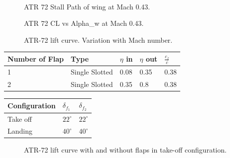 \noindent \\

\begin{figure}[H]
\centering

\caption{ATR 72 Stall Path of wing at Mach 0.43.}
\label{fig:stallATR}
\end{figure}


\begin{figure}[H]
\centering

\caption{ATR 72 CL vs Alpha_w at Mach 0.43.}
\label{fig:clATR}
\end{figure}

\begin{figure}[H]
\centering

\caption{ATR-72 lift curve. Variation with Mach number.}
\label{fig:clATR}
\end{figure}




\begin{center}
	\begin{tabular}{| l | l | l | l | l |}
	\hline
		 Number of Flap & Type &  $\eta$ in &  $\eta$ out &   $\frac{c_{f}}{c} $   \\ \hline
		1  & Single Slotted& 0.08  & 0.35 &  0.38 \\ \hline
		2  & Single Slotted& 0.35 & 0.8 & 0.38 \\ \hline
		\hline
	\end{tabular}
\end{center}


\begin{center}
	\begin{tabular}{ | l | l | l |}
		\hline
		Configuration &  $\delta_{f_1}$ & $\delta_{f_2}$  \\ \hline
		Take off &  $22^{\circ}$ &  $22^{\circ}$\\ \hline
		Landing  &  $40^{\circ}$ &  $40^{\circ}$\\ \hline
		\hline
	\end{tabular}
\end{center}



\begin{figure}[H]
\centering

\caption{ATR-72 lift curve with and without flaps in take-off configuration.}
\label{fig:clATR}
\end{figure}


